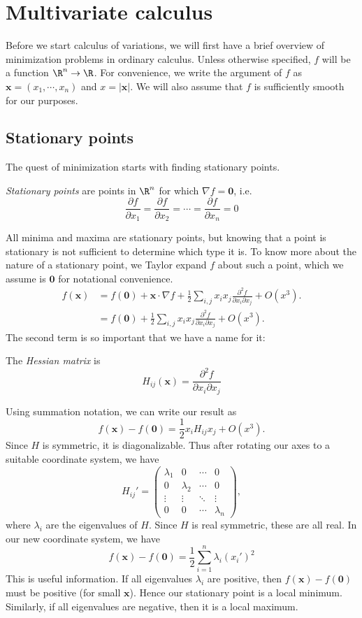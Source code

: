 \documentclass[a4paper]{article}
\begin{document}
\section{Multivariate calculus}
Before we start calculus of variations, we will first have a brief overview of minimization problems in ordinary calculus. Unless otherwise specified, $f$ will be a function $\R^n \to \R$. For convenience, we write the argument of $f$ as $\mathbf{x} = (x_1, \cdots, x_n)$ and $x = |\mathbf{x}|$. We will also assume that $f$ is sufficiently smooth for our purposes.

\subsection{Stationary points}
The quest of minimization starts with finding stationary points.
\begin{defi}
  \emph{Stationary points} are points in $\R^n$ for which $\nabla f = \mathbf{0}$, i.e.
  \[
    \frac{\partial f}{\partial x_1} = \frac{\partial f}{\partial x_2} = \cdots = \frac{\partial f}{\partial x_n} = 0
  \]
\end{defi}
All minima and maxima are stationary points, but knowing that a point is stationary is not sufficient to determine which type it is. To know more about the nature of a stationary point, we Taylor expand $f$ about such a point, which we assume is $\mathbf{0}$ for notational convenience.
\begin{align*}
  f(\mathbf{x}) &= f(\mathbf{0}) + \mathbf{x}\cdot \nabla f + \frac{1}{2}\sum_{i, j}x_ix_j\frac{\partial^2 f}{\partial x_i \partial x_j} + O(x^3).\\
  &= f(\mathbf{0}) + \frac{1}{2}\sum_{i, j}x_ix_j\frac{\partial^2 f}{\partial x_i \partial x_j} + O(x^3).
\end{align*}
The second term is so important that we have a name for it:
\begin{defi}
  The \emph{Hessian matrix} is
  \[
    H_{ij}(\mathbf{x}) = \frac{\partial^2 f}{\partial x_i \partial x_j}
  \]
\end{defi}
Using summation notation, we can write our result as
\[
  f(\mathbf{x}) - f(\mathbf{0}) = \frac{1}{2}x_i H_{ij}x_j + O(x^3).
\]
Since $H$ is symmetric, it is diagonalizable. Thus after rotating our axes to a suitable coordinate system, we have
\[
  H_{ij}' =
  \begin{pmatrix}
    \lambda_1 & 0 & \cdots & 0\\
    0 & \lambda_2 & \cdots & 0\\
    \vdots & \vdots & \ddots & \vdots \\
    0 & 0 & \cdots & \lambda_n
  \end{pmatrix},
\]
where $\lambda_i$ are the eigenvalues of $H$. Since $H$ is real symmetric, these are all real. In our new coordinate system, we have
\[
  f(\mathbf{x}) - f(\mathbf{0}) = \frac{1}{2}\sum_{i = 1}^n \lambda_i (x_i')^2
\]
This is useful information. If all eigenvalues $\lambda_i$ are positive, then $f(\mathbf{x}) - f(\mathbf{0})$ must be positive (for small $\mathbf{x}$). Hence our stationary point is a local minimum. Similarly, if all eigenvalues are negative, then it is a local maximum.
\end{document}
